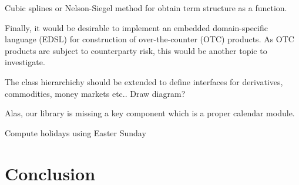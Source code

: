 Cubic splines or Nelson-Siegel method for obtain term structure as a function.

Finally, it would be desirable to implement an embedded domain-specific language (EDSL) for construction of over-the-counter (OTC) products.
As OTC products are subject to counterparty risk, this would be another topic to investigate.

The class hierarchichy should be extended to define interfaces for derivatives, commodities, money markets etc.. Draw diagram?

Alas, our library is missing a key component which is a proper calendar module.

Compute holidays using Easter Sunday

\chapter{Conclusion}
